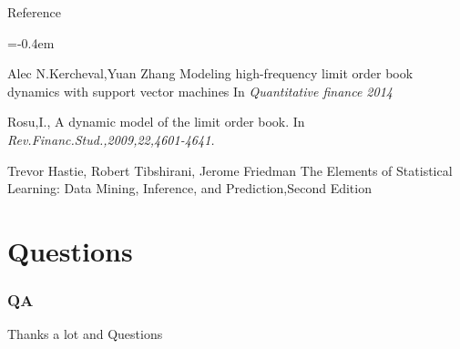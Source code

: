 \documentclass[xcolor={x11names,svgnames,dvipsnames}]{beamer}
\begin{document}
\begin{frame}
\begin{block}{Reference}
 \begin{thebibliography}{1}\itemsep=-0.4em
      \setlength{\baselineskip}{0.2em}
     
             Alec N.Kercheval,Yuan Zhang        
             \newblock Modeling high-frequency limit order book dynamics
             with support vector machines        
             \newblock In {\em Quantitative finance 2014}
     
      Rosu,I., 
      \newblock A dynamic model of the limit order book. 
      \newblock In {\em Rev.Financ.Stud.,2009,22,4601-4641.}
      
                Trevor Hastie, Robert Tibshirani, Jerome Friedman      
                \newblock The Elements of Statistical Learning: Data Mining, Inference, and Prediction,Second Edition        
               
      \end{thebibliography}
\end{block}
\end{frame}

\section{Questions}

\begin{frame}
\frametitle{QA}
\begin{center}
\huge{Thanks a lot and Questions}
\end{center}
\end{frame}
\end{document}
